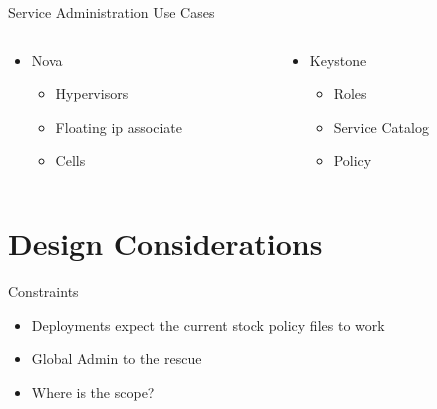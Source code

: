 \documentclass{beamer}
\begin{document}
\begin{frame}{Service Administration Use Cases}
  \begin{columns}[t,onlytextwidth]

    \begin{column}{.5\textwidth}
      \begin{itemize}
      \item Nova
        \begin{itemize}
        \item Hypervisors
        \item Floating ip associate
        \item Cells
        \end{itemize}
      \end{itemize}
    \end{column}

    \begin{column}{.5\textwidth}
      \begin{itemize}
      \item Keystone
        \begin{itemize}
        \item Roles
        \item Service Catalog 
        \item Policy
        \end{itemize}
      \end{itemize}
    \end{column}
  \end{columns}
\end{frame}


\section {Design Considerations}

\begin{frame}{Constraints}
  \begin{itemize}
  \item  Deployments expect the current stock policy files to work
  \item Global Admin to the rescue
  \item Where is the scope?
  \end{itemize}
\end{frame}
\end{document}
